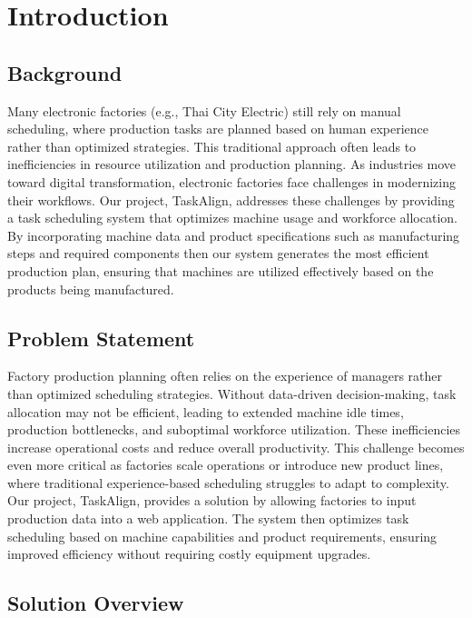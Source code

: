 \chapter{Introduction}
\label{chap:introduction}

\section{Background}
\label{section:background}

Many electronic factories (e.g., Thai City Electric) still rely on manual scheduling, where production tasks are planned based on human experience rather than optimized strategies. This traditional approach often leads to inefficiencies in resource utilization and production planning. As industries move toward digital transformation, electronic factories face challenges in modernizing their workflows.
Our project, TaskAlign, addresses these challenges by providing a task scheduling system that optimizes machine usage and workforce allocation. By incorporating machine data and product specifications such as manufacturing steps and required components then our system generates the most efficient production plan, ensuring that machines are utilized effectively based on the products being manufactured.

\section{Problem Statement}
\label{section:problem-statement}

Factory production planning often relies on the experience of managers rather than optimized scheduling strategies. Without data-driven decision-making, task allocation may not be efficient, leading to extended machine idle times, production bottlenecks, and suboptimal workforce utilization. These inefficiencies increase operational costs and reduce overall productivity.
This challenge becomes even more critical as factories scale operations or introduce new product lines, where traditional experience-based scheduling struggles to adapt to complexity. Our project, TaskAlign, provides a solution by allowing factories to input production data into a web application. The system then optimizes task scheduling based on machine capabilities and product requirements, ensuring improved efficiency without requiring costly equipment upgrades.

\section{Solution Overview}
\label{section:solution-overview}

